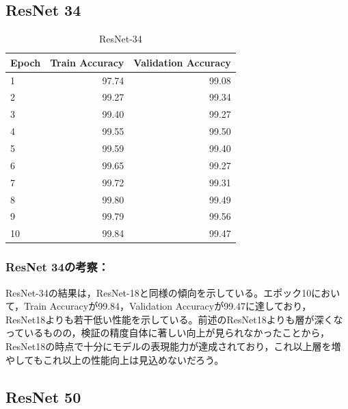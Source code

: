 \documentclass[a4paper,11pt,titlepage]{jsarticle}
\begin{document}
\subsection{ResNet 34}
\begin{table}[h]
\centering
\caption{ResNet-34}
\label{tab:ResNet34}
\begin{tabular}{lrr}
\hline
 Epoch &  Train Accuracy &  Validation Accuracy \\
\hline
     1 &           97.74 &                99.08 \\
     2 &           99.27 &                99.34 \\
     3 &           99.40 &                99.27 \\
     4 &           99.55 &                99.50 \\
     5 &           99.59 &                99.40 \\
     6 &           99.65 &                99.27 \\
     7 &           99.72 &                99.31 \\
     8 &           99.80 &                99.49 \\
     9 &           99.79 &                99.56 \\
    10 &           99.84 &                99.47 \\
\hline
\end{tabular}
\end{table}

\subsubsection*{ResNet 34の考察：}
ResNet-34の結果は，ResNet-18と同様の傾向を示している。エポック10において，Train Accuracyが99.84，Validation Accuracyが99.47に達しており，ResNet18よりも若干低い性能を示している。前述のResNet18よりも層が深くなっているものの，検証の精度自体に著しい向上が見られなかったことから，ResNet18の時点で十分にモデルの表現能力が達成されており，これ以上層を増やしてもこれ以上の性能向上は見込めないだろう。

\subsection{ResNet 50}
\end{document}
